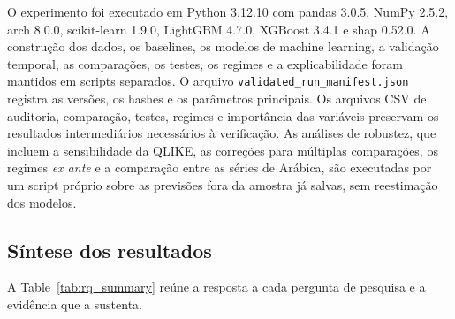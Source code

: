 \documentclass[a4paper,fleqn]{cas-sc}
\begin{document}
O experimento foi executado em Python 3.12.10 com pandas 3.0.5, NumPy 2.5.2, arch 8.0.0, scikit-learn 1.9.0, LightGBM 4.7.0, XGBoost 3.4.1 e shap 0.52.0. A construção dos dados, os baselines, os modelos de machine learning, a validação temporal, as comparações, os testes, os regimes e a explicabilidade foram mantidos em scripts separados. O arquivo \texttt{validated\_run\_manifest.json} registra as versões, os hashes e os parâmetros principais. Os arquivos CSV de auditoria, comparação, testes, regimes e importância das variáveis preservam os resultados intermediários necessários à verificação. As análises de robustez, que incluem a sensibilidade da QLIKE, as correções para múltiplas comparações, os regimes \textit{ex ante} e a comparação entre as séries de Arábica, são executadas por um script próprio sobre as previsões fora da amostra já salvas, sem reestimação dos modelos.

\subsection{Síntese dos resultados}
\label{subsec:results_summary}

A Table~\ref{tab:rq_summary} reúne a resposta a cada pergunta de pesquisa e a evidência que a sustenta.
\end{document}
